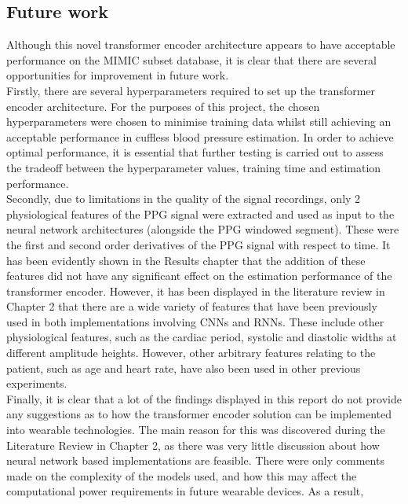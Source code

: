 \subsection{Future work}
Although this novel transformer encoder architecture appears to 
have acceptable performance on the MIMIC subset database, it is 
clear that there are several opportunities for improvement in 
future work. \\ \newline \noindent Firstly, there are several hyperparameters required 
to set up the transformer encoder architecture. For the purposes of this project, the chosen 
hyperparameters were chosen to minimise training data whilst still achieving an acceptable performance in cuffless blood pressure estimation. 
In order to achieve optimal performance, it is essential that 
further testing is carried out to assess the tradeoff between the hyperparameter values, training time and estimation performance.\\ \newline \noindent Secondly, due to limitations in the quality of the signal recordings, only 2 physiological features of the PPG signal 
were extracted and used as input to the neural network architectures (alongside the PPG windowed segment). These were the first and second order 
derivatives of the PPG signal with respect to time. It has been evidently shown in the Results chapter that the addition of these features did not have any significant effect on the 
estimation performance of the transformer encoder. However, it has been displayed in the literature review in Chapter 2 that there are a wide variety of features that have been previously 
used in both implementations involving CNNs and RNNs. These include other physiological features, such as the cardiac period, systolic and diastolic widths at different amplitude heights. However, other arbitrary features relating to the patient, such as age and heart rate, have also been used 
in other previous experiments. \\ \newline \noindent Finally, it is clear that a lot of the findings displayed in this report do not 
provide any suggestions as to how the transformer encoder solution can be implemented into wearable technologies. The main reason for this was discovered 
during the Literature Review in Chapter 2, as there was very little discussion about how neural network based implementations are feasible. There were only 
comments made on the complexity of the models used, and how this may affect the computational power requirements in future wearable devices. As a result, 
